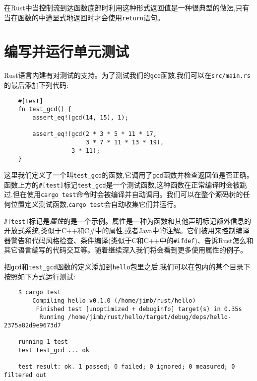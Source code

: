 在Rust中当控制流到达函数底部时利用这种形式返回值是一种很典型的做法,只有当在函数的中途显式地返回时才会使用\texttt{return}语句。

\section{编写并运行单元测试}\label{test}
Rust语言内建有对测试的支持。为了测试我们的\texttt{gcd}函数,我们可以在\texttt{src/main.rs}的最后添加下列代码:
\begin{verbatim}
    #[test]
    fn test_gcd() {
        assert_eq!(gcd(14, 15), 1);

        assert_eq!(gcd(2 * 3 * 5 * 11 * 17,
                       3 * 7 * 11 * 13 * 19),
                   3 * 11);
    }
\end{verbatim}

这里我们定义了一个叫\texttt{test\_gcd}的函数,它调用了\texttt{gcd}函数并检查返回值是否正确。函数上方的\texttt{\#[test]}标记\texttt{test\_gcd}是一个测试函数,这种函数在正常编译时会被跳过,但在使用\texttt{cargo test}命令时会被编译并自动调用。我们可以在整个源码树的任何位置定义测试函数,\texttt{cargo test}会自动收集它们并运行。

\texttt{\#[test]}标记是\emph{属性}的是一个示例。属性是一种为函数和其他声明标记额外信息的开放式系统,类似于C++和C\#中的属性,或者Java中的注解。它们被用来控制编译器警告和代码风格检查、条件编译(类似于C和C++中的\texttt{\#ifdef})、告诉Rust怎么和其它语言编写的代码交互等。随着继续深入我们将会看到更多使用属性的例子。

把\texttt{gcd}和\texttt{test\_gcd}函数的定义添加到\texttt{hello}包里之后,我们可以在包内的某个目录下按照如下方式运行测试:
\begin{verbatim}
    $ cargo test
        Compiling hello v0.1.0 (/home/jimb/rust/hello)
         Finished test [unoptimized + debuginfo] target(s) in 0.35s
          Running /home/jimb/rust/hello/target/debug/deps/hello-2375a82d9e9673d7

    running 1 test
    test test_gcd ... ok
    
    test result: ok. 1 passed; 0 failed; 0 ignored; 0 measured; 0 filtered out
\end{verbatim}

